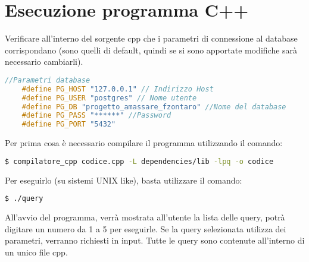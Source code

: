 \section{Esecuzione programma C++}
  Verificare all'interno del sorgente cpp che i parametri di connessione
  al database corrispondano (sono quelli di default, quindi se si sono apportate
  modifiche sarà necessario cambiarli).
  \begin{lstlisting}[language=c++]
    //Parametri database
    #define PG_HOST "127.0.0.1" // Indirizzo Host
    #define PG_USER "postgres" // Nome utente
    #define PG_DB "progetto_amassare_fzontaro" //Nome del database
    #define PG_PASS "******" //Password
    #define PG_PORT "5432"
  \end{lstlisting}

  \noindent
  Per prima cosa è necessario compilare il programma utilizzando il comando:
  
  \begin{lstlisting}[language=bash]
  $ compilatore_cpp codice.cpp -L dependencies/lib -lpq -o codice
  \end{lstlisting}

  \noindent
  Per eseguirlo (su sistemi UNIX like), basta utilizzare il comando:
  \begin{lstlisting}[language=bash]
  $ ./query
  \end{lstlisting}

  \noindent
  All'avvio del programma, verrà mostrata all'utente la lista delle query, potrà digitare un numero da 1 a 5 per eseguirle. Se la query selezionata utilizza dei parametri, verranno richiesti in input.
  \newline
  Tutte le query sono contenute all'interno di un unico file cpp.
  